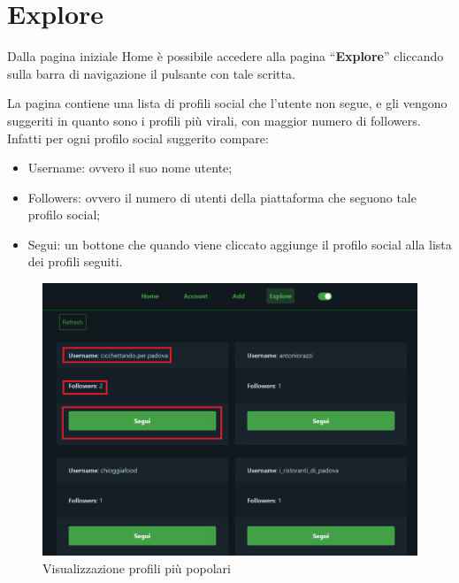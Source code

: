 \section{Explore} {
    Dalla pagina iniziale Home è possibile accedere alla pagina ``\textbf{Explore}'' cliccando sulla barra di navigazione il pulsante con tale scritta.

    La pagina contiene una lista di profili social che l'utente non segue, e gli vengono suggeriti in quanto sono i profili più virali, con maggior numero di followers.
    Infatti per ogni profilo social suggerito compare:
    \begin{itemize}
        \item Username: ovvero il suo nome utente;
        \item Followers: ovvero il numero di utenti della piattaforma \platform{} che seguono tale profilo social;
        \item Segui: un bottone che quando viene cliccato aggiunge il profilo social alla lista dei profili seguiti.
    \end{itemize}

    \begin{figure}[H]
        \includegraphics[width=12cm]{sezioni/images/explore.png}
        \centering
        \caption{Visualizzazione profili più popolari}
    \end{figure}
}   

